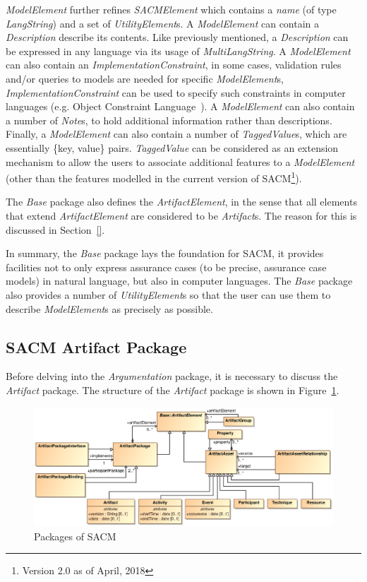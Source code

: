 \textit{ModelElement} further refines \textit{SACMElement} which contains a \textit{name} (of type \textit{LangString}) and a set of \textit{UtilityElement}s. A \textit{ModelElement} can contain a \textit{Description} describe its contents. Like previously mentioned, a \textit{Description} can be expressed in any language via its usage of \textit{MultiLangString}. A \textit{ModelElement} can also contain an \textit{ImplementationConstraint}, in some cases, validation rules and/or queries to models are needed for specific \textit{ModelElement}s, \textit{ImplementationConstraint} can be used to specify such constraints in computer languages (e.g. Object Constraint Language~\cite{}). A \textit{ModelElement} can also contain a number of \textit{Note}s, to hold additional information rather than descriptions. Finally, a \textit{ModelElement} can also contain a number of \textit{TaggedValue}s, which are essentially \{key, value\} pairs. \textit{TaggedValue} can be considered as an extension mechanism to allow the users to associate additional features to a \textit{ModelElement} (other than the features modelled in the current version of SACM\footnote{Version 2.0 as of April, 2018}).

The \textit{Base} package also defines the \textit{ArtifactElement}, in the sense that all elements that extend \textit{ArtifactElement} are considered to be \textit{Artifact}s. The reason for this is discussed in Section~\ref{}. 

In summary, the \textit{Base} package lays the foundation for SACM, it provides facilities not to only express assurance cases (to be precise, assurance case models) in natural language, but also in computer languages. The \textit{Base} package also provides a number of \textit{UtilityElement}s so that the user can use them to describe \textit{ModelElement}s as precisely as possible.

\subsection{SACM Artifact Package}
\label{sec:artiPack}
Before delving into the \textit{Argumentation} package, it is necessary to discuss the \textit{Artifact} package. The structure of the \textit{Artifact} package is shown in Figure~\ref{fig:arti}. 
\begin{figure}
	\centering
	\includegraphics[width=1\linewidth]{fig/Artifact.eps}
	\caption{Packages of SACM}
	\label{fig:arti}
\end{figure}

